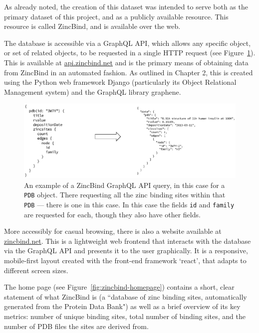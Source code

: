As already noted, the creation of this dataset was intended to serve both as the primary dataset of this project, and as a publicly available resource. This resource is called ZincBind, and is available over the web.

The database is accessible via a GraphQL API, which allows any specific object, or set of related objects, to be requested in a single HTTP request (see Figure~\ref{fig:zincbind-api-example}). This is available at \url{api.zincbind.net} and is the primary means of obtaining data from ZincBind in an automated fashion. As outlined in Chapter 2, this is created using the Python web framework Django (particularly its Object Relational Management system) and the GraphQL library graphene.

\begin{figure}
\centering
\includegraphics[width=1.0\textwidth]{Figures/zincbind-api-example.eps}
\caption[An example of a ZincBind GraphQL API query.]{\label{fig:zincbind-api-example} An example of a ZincBind GraphQL API query, in this case for a \texttt{PDB} object.
There requesting all the zinc binding sites within that \texttt{PDB} --- there is
one in this case. In this case the fields \texttt{id} and \texttt{family} are
requested for each, though they also have other fields.}
\end{figure}

More accessibly for casual browsing, there is also a website available at \url{zincbind.net}. This is a lightweight web frontend that interacts with the database via the GraphQL API and presents it to the user graphically. It is a responsive, mobile-first layout created with the front-end framework `react', that adapts to different screen sizes.

The home page (see Figure~\ref{fig:zincbind-homepage}) contains a short, clear statement of what ZincBind is (a ``database of zinc binding sites, automatically generated from the Protein Data Bank") as well as a brief overview of its key metrics: number of unique binding sites, total number of binding sites, and the number of PDB files the sites are derived from.


